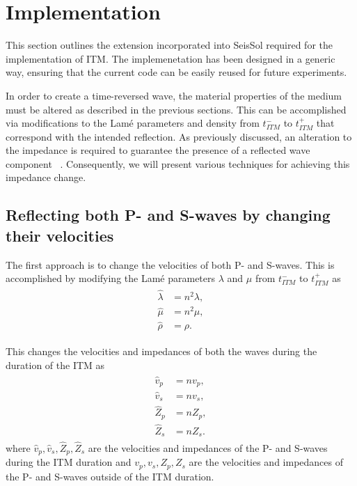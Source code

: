 \section{Implementation}\label{section:Implementation}

This section outlines the extension incorporated into SeisSol required for the implementation of \ac{ITM}. The implemenetation has been designed in a generic way,
ensuring that the current code can be easily reused for future experiments.

In order to create a time-reversed wave, the material properties of the medium must be altered as described in the previous sections. This can be accomplished via
modifications to the Lam\'{e} parameters and density from $t_{ITM}^-$ to $t_{ITM}^+$ that correspond with the intended reflection. As previously discussed, an alteration
to the impedance is required to guarantee the presence of a reflected wave component ~\parencite[Sec 9.8]{leveque_2002}. Consequently, we will present various techniques
for achieving this impedance change.

\subsection{Reflecting both P- and S-waves by changing their velocities}\label{sec:reflecting_both}
The first approach is to change the velocities of both P- and S-waves. This is accomplished by modifying the Lam\'{e} parameters $\lambda$ and $\mu$ from $t_{ITM}^-$ to $t_{ITM}^+$ as
\begin{align}
    \begin{split}
        \hat{\lambda} &= n^2 \lambda , \\
        \hat{\mu} &= n^2 \mu ,\\
        \hat{\rho} &= \rho .
    \end{split}
\end{align}

This changes the velocities and impedances of both the waves during the duration of the \ac{ITM} as
\begin{align}
    \begin{split}
        \hat{v}_p &= n v_p ,\\
        \hat{v}_s &= n v_s ,\\
        \hat{Z}_p &= n Z_p ,\\
        \hat{Z}_s &= n Z_s .
    \end{split}
\end{align}
where $\hat{v}_p, \hat{v}_s, \hat{Z}_p, \hat{Z}_s$ are the velocities and impedances of the P- and S-waves during the \ac{ITM} duration and 
$v_p, v_s, Z_p, Z_s$ are the velocities and impedances of the P- and S-waves outside of the \ac{ITM} duration.

